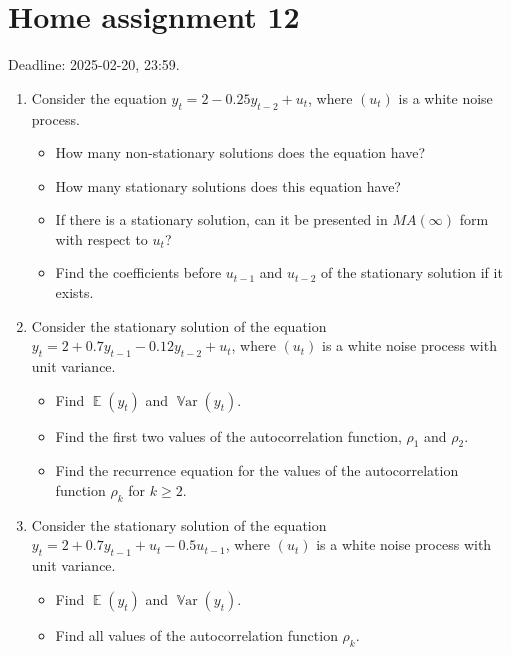 \documentclass[12pt]{article}
\DeclareMathOperator{\Var}{\mathbb{V}ar}
\DeclareMathOperator{\E}{\mathbb{E}}
\begin{document}
\section*{Home assignment 12}

Deadline: 2025-02-20, 23:59.

\begin{enumerate}

\item Consider the equation $y_t = 2 - 0.25 y_{t-2} + u_t$, where $(u_t)$ is a white noise process.

\begin{itemize}
\item How many non-stationary solutions does the equation have?
\item How many stationary solutions does this equation have?
\item If there is a stationary solution, can it be presented in $MA(\infty)$ form with respect to $u_t$? 
\item Find the coefficients before $u_{t-1}$ and $u_{t-2}$ of the stationary solution if it exists.
\end{itemize}


\item Consider the stationary solution of the equation $y_t = 2 + 0.7 y_{t-1} - 0.12 y_{t-2} + u_t$, where $(u_t)$ is a white noise process with unit variance.

\begin{itemize}
\item Find $\E(y_t)$ and $\Var(y_t)$.
\item Find the first two values of the autocorrelation function, $\rho_1$ and $\rho_2$.
\item Find the recurrence equation for the values of the autocorrelation function $\rho_k$ for $k \geq 2$.
\end{itemize}


\item Consider the stationary solution of the equation $y_t = 2 + 0.7 y_{t-1} + u_t - 0.5 u_{t-1}$, where $(u_t)$ is a white noise process with unit variance.

\begin{itemize}
\item Find $\E(y_t)$ and $\Var(y_t)$.
\item Find all values of the autocorrelation function $\rho_k$.
\end{itemize}


\end{enumerate}
\end{document}
